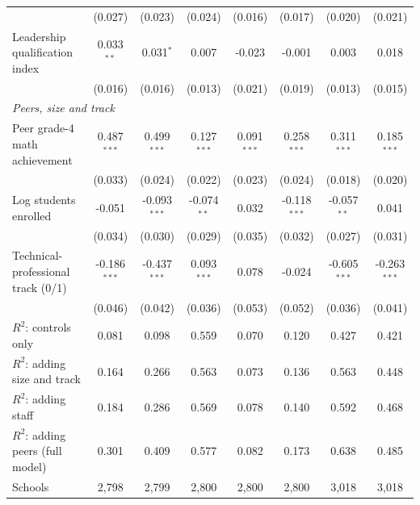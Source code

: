 \begin{table}[!htbp]
{\begin{tabular}{lccccccc}
 & (0.027) & (0.023) & (0.024) & (0.016) & (0.017) & (0.020) & (0.021) \\
\quad Leadership qualification index & 0.033$^{**}$ & 0.031$^{*}$ & 0.007 & -0.023 & -0.001 & 0.003 & 0.018 \\
 & (0.016) & (0.016) & (0.013) & (0.021) & (0.019) & (0.013) & (0.015) \\
\multicolumn{8}{l}{\textit{Peers, size and track}} \\
\quad Peer grade-4 math achievement & 0.487$^{***}$ & 0.499$^{***}$ & 0.127$^{***}$ & 0.091$^{***}$ & 0.258$^{***}$ & 0.311$^{***}$ & 0.185$^{***}$ \\
 & (0.033) & (0.024) & (0.022) & (0.023) & (0.024) & (0.018) & (0.020) \\
\quad Log students enrolled & -0.051 & -0.093$^{***}$ & -0.074$^{**}$ & 0.032 & -0.118$^{***}$ & -0.057$^{**}$ & 0.041 \\
 & (0.034) & (0.030) & (0.029) & (0.035) & (0.032) & (0.027) & (0.031) \\
\quad Technical-professional track (0/1) & -0.186$^{***}$ & -0.437$^{***}$ & 0.093$^{***}$ & 0.078 & -0.024 & -0.605$^{***}$ & -0.263$^{***}$ \\
 & (0.046) & (0.042) & (0.036) & (0.053) & (0.052) & (0.036) & (0.041) \\
\midrule
$R^2$: controls only & 0.081 & 0.098 & 0.559 & 0.070 & 0.120 & 0.427 & 0.421 \\
$R^2$: adding size and track & 0.164 & 0.266 & 0.563 & 0.073 & 0.136 & 0.563 & 0.448 \\
$R^2$: adding staff & 0.184 & 0.286 & 0.569 & 0.078 & 0.140 & 0.592 & 0.468 \\
$R^2$: adding peers (full model) & 0.301 & 0.409 & 0.577 & 0.082 & 0.173 & 0.638 & 0.485 \\
Schools & 2,798 & 2,799 & 2,800 & 2,800 & 2,800 & 3,018 & 3,018 \\
\bottomrule
\end{tabular}}
\par\medskip
\footnotesize
\begin{minipage}{\textwidth}

\end{minipage}
\end{table}
